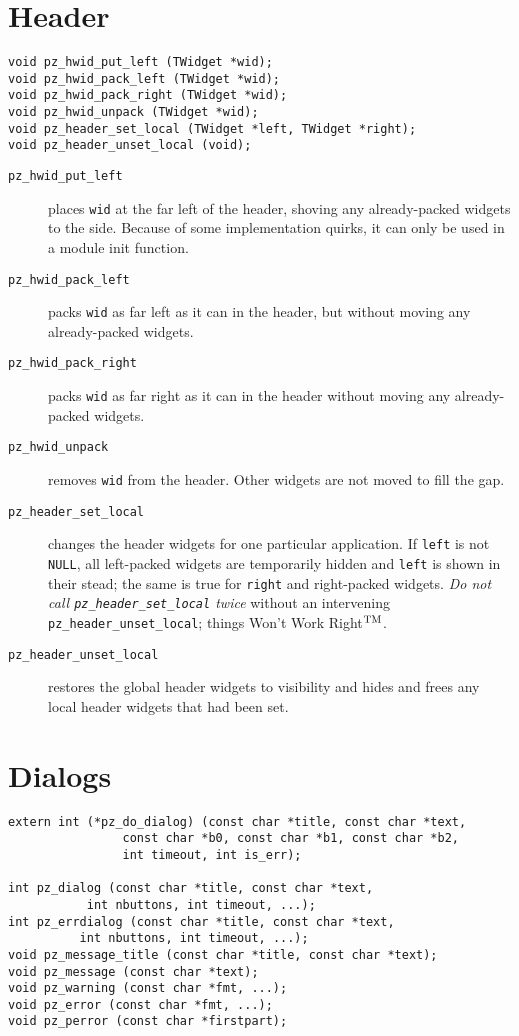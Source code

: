 \documentclass[12pt,letterpaper]{report}
\let\ttt\tt
\def\tt{\def\_{{\ttt\char`\_}}\ttt}
\def\texttt#1{{\tt #1}}
\begin{document}
\section{Header}
\begin{verbatim}
void pz_hwid_put_left (TWidget *wid);
void pz_hwid_pack_left (TWidget *wid);
void pz_hwid_pack_right (TWidget *wid);
void pz_hwid_unpack (TWidget *wid);
void pz_header_set_local (TWidget *left, TWidget *right);
void pz_header_unset_local (void);
\end{verbatim}

\begin{description}
\item[{\tt pz_hwid_put_left}] places \verb|wid| at the far left of the header, shoving
any already-packed widgets to the side. Because of some implementation quirks, it can only
be used in a module init function.
\item[{\tt pz_hwid_pack_left}] packs \verb|wid| as far left as it can in the header, but without
moving any already-packed widgets.
\item[{\tt pz_hwid_pack_right}] packs \verb|wid| as far right as it can in the header without moving
any already-packed widgets.
\item[{\tt pz_hwid_unpack}] removes \verb|wid| from the header. Other widgets are not moved to fill
the gap.
\item[{\tt pz_header_set_local}] changes the header widgets for one particular application.
If \verb|left| is not \verb|NULL|, all left-packed widgets are temporarily hidden and \verb|left|
is shown in their stead; the same is true for \verb|right| and right-packed widgets.
{\it Do not call \texttt{pz_header_set_local} twice} without an intervening \verb|pz_header_unset_local|;
things Won't Work Right$^{\rm TM}$.
\item[{\tt pz_header_unset_local}] restores the global header widgets to visibility and hides
and frees any local header widgets that had been set.
\end{description}

\section{Dialogs}
\begin{verbatim}
extern int (*pz_do_dialog) (const char *title, const char *text,
			    const char *b0, const char *b1, const char *b2,
			    int timeout, int is_err);

int pz_dialog (const char *title, const char *text,
	       int nbuttons, int timeout, ...);
int pz_errdialog (const char *title, const char *text,
		  int nbuttons, int timeout, ...);
void pz_message_title (const char *title, const char *text);
void pz_message (const char *text);
void pz_warning (const char *fmt, ...);
void pz_error (const char *fmt, ...);
void pz_perror (const char *firstpart);
\end{verbatim}
\end{document}
